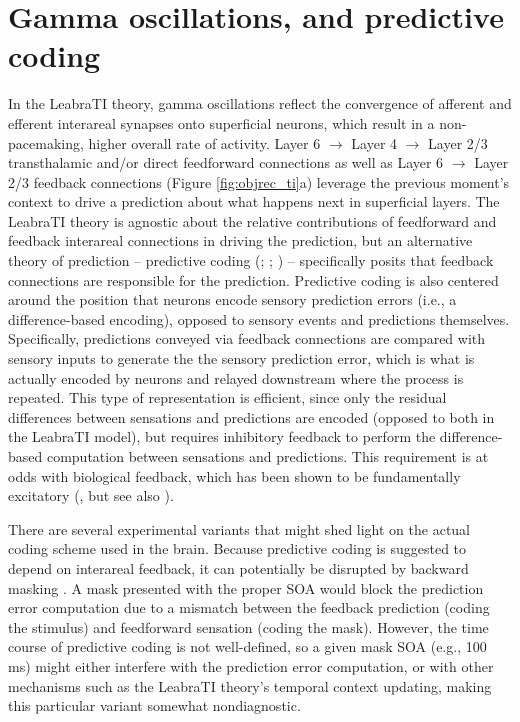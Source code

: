 \documentclass[defaultstyle,12pt]{thesis}
\begin{document}
{\section{Gamma oscillations, and predictive coding} 
In the LeabraTI theory, gamma oscillations reflect the convergence of afferent and efferent interareal synapses onto superficial neurons, which result in a non-pacemaking, higher overall rate of activity. Layer 6 $\rightarrow$ Layer 4 $\rightarrow$ Layer 2/3 transthalamic and/or direct feedforward connections as well as Layer 6 $\rightarrow$ Layer 2/3 feedback connections (Figure \ref{fig:objrec_ti}a) leverage the previous moment's context to drive a prediction about what happens next in superficial layers. The LeabraTI theory is agnostic about the relative contributions of feedforward and feedback interareal connections in driving the prediction, but an alternative theory of prediction -- predictive coding (; ; ) -- specifically posits that feedback connections are responsible for the prediction. Predictive coding is also centered around the position that neurons encode sensory prediction errors (i.e., a difference-based encoding), opposed to sensory events and predictions themselves. Specifically, predictions conveyed via feedback connections are compared with sensory inputs to generate the the sensory prediction error, which is what is actually encoded by neurons and relayed downstream where the process is repeated. This type of representation is efficient, since only the residual differences between sensations and predictions are encoded (opposed to both in the LeabraTI model), but requires inhibitory feedback to perform the difference-based computation between sensations and predictions. This requirement is at odds with biological feedback, which has been shown to be fundamentally excitatory (, but see also ).

There are several experimental variants that might shed light on the actual coding scheme used in the brain. Because predictive coding is suggested to depend on interareal feedback, it can potentially be disrupted by backward masking \cite{WyatteCurranOReilly12,LammeRoelfsema00,DiLolloEnnsRensink00}. A mask presented with the proper SOA would block the prediction error computation due to a mismatch between the feedback prediction (coding the stimulus) and feedforward sensation (coding the mask). However, the time course of predictive coding is not well-defined, so a given mask SOA (e.g., 100 ms) might either interfere with the prediction error computation, or with other mechanisms such as the LeabraTI theory's temporal context updating, making this particular variant somewhat nondiagnostic. 

}
\end{document}
